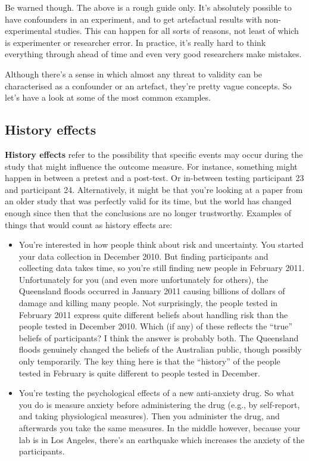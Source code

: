 \documentclass[
  letterpaper,
]{book}
\begin{document}
Be warned though. The above is a rough guide only. It's absolutely
possible to have confounders in an experiment, and to get artefactual
results with non-experimental studies. This can happen for all sorts of
reasons, not least of which is experimenter or researcher error. In
practice, it's really hard to think everything through ahead of time and
even very good researchers make mistakes.

Although there's a sense in which almost any threat to validity can be
characterised as a confounder or an artefact, they're pretty vague
concepts. So let's have a look at some of the most common examples.

\hypertarget{history-effects}{%
\subsection{History effects}\label{history-effects}}

\textbf{History effects} refer to the possibility that specific events
may occur during the study that might influence the outcome measure. For
instance, something might happen in between a pretest and a post-test.
Or in-between testing participant 23 and participant 24. Alternatively,
it might be that you're looking at a paper from an older study that was
perfectly valid for its time, but the world has changed enough since
then that the conclusions are no longer trustworthy. Examples of things
that would count as history effects are:

\begin{itemize}
\item
  You're interested in how people think about risk and uncertainty. You
  started your data collection in December 2010. But finding
  participants and collecting data takes time, so you're still finding
  new people in February 2011. Unfortunately for you (and even more
  unfortunately for others), the Queensland floods occurred in January
  2011 causing billions of dollars of damage and killing many people.
  Not surprisingly, the people tested in February 2011 express quite
  different beliefs about handling risk than the people tested in
  December 2010. Which (if any) of these reflects the ``true'' beliefs
  of participants? I think the answer is probably both. The Queensland
  floods genuinely changed the beliefs of the Australian public, though
  possibly only temporarily. The key thing here is that the ``history''
  of the people tested in February is quite different to people tested
  in December.
\item
  You're testing the psychological effects of a new anti-anxiety drug.
  So what you do is measure anxiety before administering the drug (e.g.,
  by self-report, and taking physiological measures). Then you
  administer the drug, and afterwards you take the same measures. In the
  middle however, because your lab is in Los Angeles, there's an
  earthquake which increases the anxiety of the participants.
\end{itemize}
\end{document}
